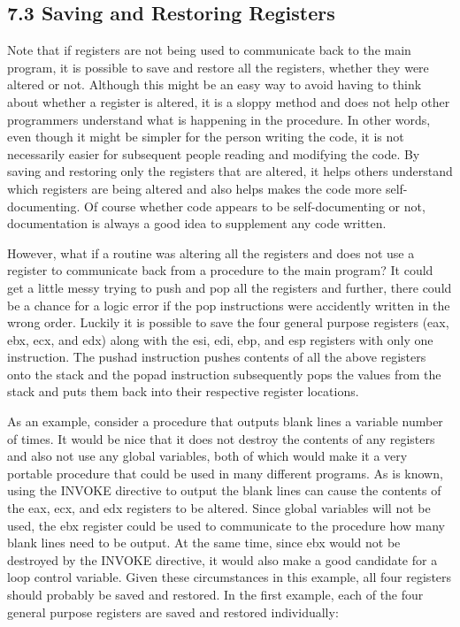 \documentclass[10pt]{book}
\begin{document}
\subsection*{7.3 Saving and Restoring Registers}
Note that if registers are not being used to communicate back to the main program, it is possible to save and restore all the registers, whether they were altered or not. Although this might be an easy way to avoid having to think about whether a register is altered, it is a sloppy method and does not help other programmers understand what is happening in the procedure. In other words, even though it might be simpler for the person writing the code, it is not necessarily easier for subsequent people reading and modifying the code. By saving and restoring only the registers that are altered, it helps others understand which registers are being altered and also helps makes the code more self-documenting. Of course whether code appears to be self-documenting or not, documentation is always a good idea to supplement any code written.

However, what if a routine was altering all the registers and does not use a register to communicate back from a procedure to the main program? It could get a little messy trying to push and pop all the registers and further, there could be a chance for a logic error if the pop instructions were accidently written in the wrong order. Luckily it is possible to save the four general purpose registers (eax, ebx, ecx, and edx) along with the esi, edi, ebp, and esp registers with only one instruction. The pushad instruction pushes contents of all the above registers onto the stack and the popad instruction subsequently pops the values from the stack and puts them back into their respective register locations.

As an example, consider a procedure that outputs blank lines a variable number of times. It would be nice that it does not destroy the contents of any registers and also not use any global variables, both of which would make it a very portable procedure that could be used in many different programs. As is known, using the INVOKE directive to output the blank lines can cause the contents of the eax, ecx, and edx registers to be altered. Since global variables will not be used, the ebx register could be used to communicate to the procedure how many blank lines need to be output. At the same time, since ebx would not be destroyed by the INVOKE directive, it would also make a good candidate for a loop control variable. Given these circumstances in this example, all four registers should probably be saved and restored. In the first example, each of the four general purpose registers are saved and restored individually:
\end{document}
